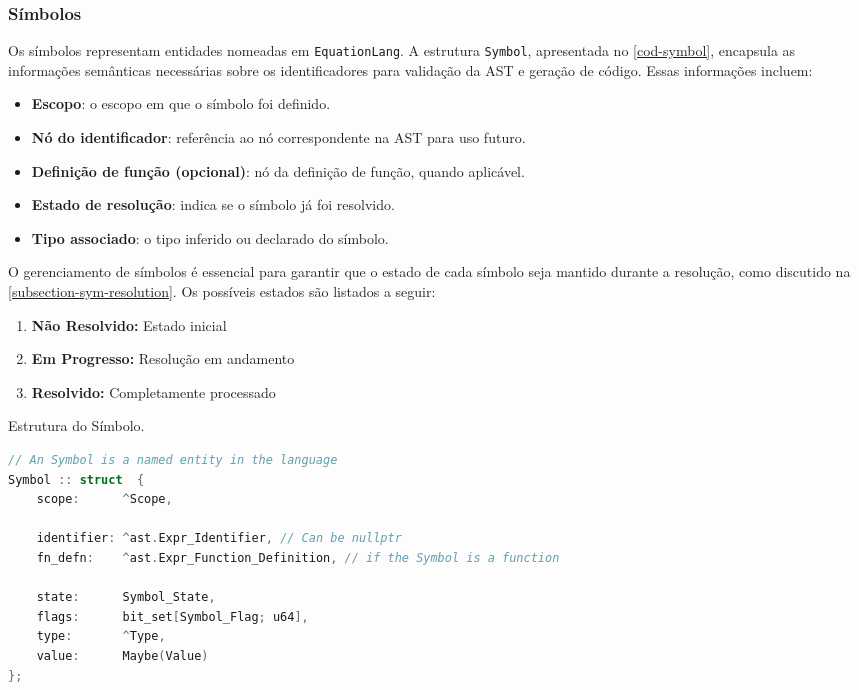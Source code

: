 \subsubsection{Símbolos}

Os símbolos representam entidades nomeadas em \texttt{EquationLang}. A estrutura \texttt{Symbol}, apresentada no \autoref{cod-symbol}, encapsula as informações semânticas necessárias sobre os identificadores para validação da AST e geração de código. Essas informações incluem: \begin{itemize} \item \textbf{Escopo}: o escopo em que o símbolo foi definido. \item \textbf{Nó do identificador}: referência ao nó correspondente na AST para uso futuro. \item \textbf{Definição de função (opcional)}: nó da definição de função, quando aplicável. \item \textbf{Estado de resolução}: indica se o símbolo já foi resolvido. \item \textbf{Tipo associado}: o tipo inferido ou declarado do símbolo. \end{itemize}

O gerenciamento de símbolos é essencial para garantir que o estado de cada símbolo seja mantido durante a resolução, como discutido na \autoref{subsection-sym-resolution}. Os possíveis estados são listados a seguir:
\begin{enumerate}
    \item \textbf{Não Resolvido:} Estado inicial
    \item \textbf{Em Progresso:} Resolução em andamento
    \item \textbf{Resolvido:} Completamente processado
\end{enumerate}

\begin{codigo}[H]
    \caption{\small Estrutura do Símbolo.}
    \label{cod-symbol}
\begin{lstlisting}[language=C, numbers=none, frame=none, inputencoding=latin1]
// An Symbol is a named entity in the language
Symbol :: struct  {
    scope:      ^Scope,

    identifier: ^ast.Expr_Identifier, // Can be nullptr
    fn_defn:    ^ast.Expr_Function_Definition, // if the Symbol is a function

    state:      Symbol_State,
    flags:      bit_set[Symbol_Flag; u64],
    type:       ^Type,
    value:      Maybe(Value)
};

\end{lstlisting}
\end{codigo}


